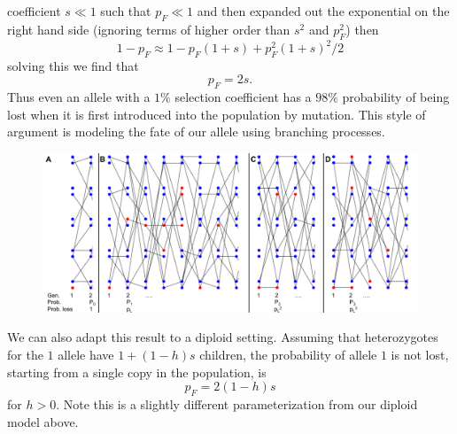 coefficient $s \ll 1$ such that $p_F \ll 1$ and then expanded out the
exponential on the right hand side (ignoring terms of higher
order than $s^2$ and $p_F^2$) then
\begin{equation}
1-p_F \approx 1-p_F(1+s)+p_F^2(1+s)^2/2
\end{equation}
solving this we find that
\begin{equation}
p_F = 2s.
\end{equation}
Thus even an allele with a $1\%$ selection coefficient has a $98\%$
probability of being lost when it is first introduced into the
population by mutation. This style of argument is modeling the fate of
our allele using branching processes.\\

\begin{figure}
\begin{center}
\includegraphics[width=\textwidth]{figures/Proof_of_pL_2s}
\end{center}
\caption{} \label{fig:Proof_of_pL_2s}
\end{figure}

We can also adapt this result to a diploid setting.
Assuming that heterozygotes for the $1$ allele have $1+(1-h)s$ children, the
probability of allele $1$ is not lost, starting from a single copy in
the population, is
\begin{equation}
p_F = 2 (1-h)s \label{eqn:diploid_escape}
\end{equation}
for $h>0$. Note this is a slightly different parameterization from
our diploid model above.\\


